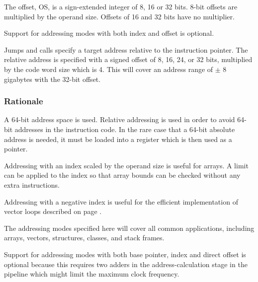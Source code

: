 \documentclass[forwardcom.tex]{subfiles}
\begin{document}
The offset, OS, is a sign-extended integer of 8, 16 or 32 bits. 8-bit offsets are multiplied by the operand size. Offsets of 16 and 32 bits have no multiplier.
\vspace{2mm}

Support for addressing modes with both index and offset is optional.
\vspace{2mm}

Jumps and calls specify a target address relative to the instruction pointer. The relative address is specified with a signed offset of 8, 16, 24, or 32 bits, multiplied by the code word size which is 4. This will cover an address range of
$\pm$ 8 gigabytes with the 32-bit offset.
\vspace{2mm}

\subsubsection{Rationale}
A 64-bit address space is used. Relative addressing is used in order to avoid 64-bit addresses in the instruction code. In the rare case that a 64-bit absolute address is needed, it must be loaded into a register which is then used as a pointer.
\vspace{2mm}

Addressing with an index scaled by the operand size is useful for arrays. A limit can be applied to the index so that array bounds can be checked without any extra instructions.
\vspace{2mm}

Addressing with a negative index is useful for the efficient implementation of vector loops described on page \pageref{vectorLoops}.
\vspace{2mm}

The addressing modes specified here will cover all common applications, including arrays, vectors, structures, classes, and stack frames.
\vspace{2mm}

Support for addressing modes with both base pointer, index and direct offset is optional because this requires two adders in the address-calculation stage in the pipeline which might limit the maximum clock frequency.
\end{document}
